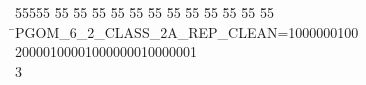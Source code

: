 %
%
\begin{tabbing}
55555 \= 55 \= 55 \= 55 \= 55 \= 55 \= 55 \= 55 \= 55 \= 55 \= 55 \= 55 \= 55 \= \>PGOM\_6\_2\_CLASS\_2A\_REP\_CLEAN=1000000100\\[0pt]
20000100001000000010000001\\[0pt]
3\>\end{tabbing}
